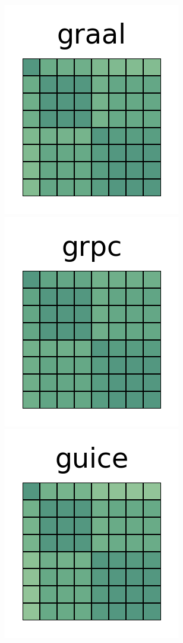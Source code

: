 \documentclass[10pt,conference]{IEEEtran}
\begin{document}
\begin{figure}[htb!]
 \includegraphics[width=\heatmapWidth, keepaspectratio]{entropy-correlations/graal-grids.png}
 \includegraphics[width=\heatmapWidth, keepaspectratio]{entropy-correlations/grpc-java-grids.png}
 \includegraphics[width=\heatmapWidth, keepaspectratio]{entropy-correlations/guice-grids.png}

\end{figure}
\end{document}
